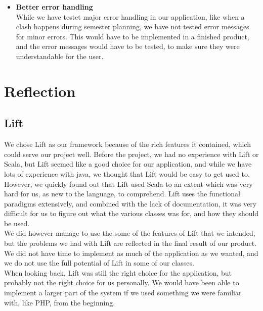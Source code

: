 \begin{itemize}
	\item \textbf{Better error handling}\\
	While we have testet major error handling in our application, like when a clash happens during semester planning, we have not tested error messages for minor errors. This would have to be implemented in a finished product, and the error messages would have to be tested, to make sure they were understandable for the user.
\end{itemize}

\section{Reflection}
\label{sec:reflection}

\subsection{Lift}
We chose Lift as our framework because of the rich features it contained, which could serve our project well. Before the project, we had no experience with Lift or Scala, but Lift seemed like a good choice for our application, and while we have lots of experience with java, we thought that Lift would be easy to get used to.\\
However, we quickly found out that Lift used Scala to an extent which was very hard for us, as new to the language, to comprehend. Lift uses the functional paradigms extensively, and combined with the lack of documentation, it was very difficult for us to figure out what the various classes was for, and how they should be used.\\
We did however manage to use the some of the features of Lift that we intended, but the problems we had with Lift are reflected in the final result of our product. We did not have time to implement as much of the application as we wanted, and we do not use the full potential of Lift in some of our classes. \\ 

When looking back, Lift was still the right choice for the application, but probably not the right choice for us personally. We would have been able to implement a larger part of the system if we used something we were familiar with, like PHP, from the beginning.

